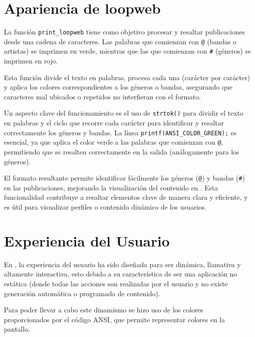 \section{Apariencia de loopweb}
La función \texttt{print\_loopweb} tiene como objetivo procesar y resaltar publicaciones desde una cadena de caracteres. Las palabras que comienzan con \texttt{@} (bandas o artistas) se imprimen en verde, mientras que las que comienzan con \texttt{\#} (géneros) se imprimen en rojo.

Esta función divide el texto en palabras, procesa cada una (carácter por carácter) y aplica los colores correspondientes a los géneros o bandas, asegurando que caracteres mal ubicados o repetidos no interfieran con el formato.

Un aspecto clave del funcionamiento es el uso de \texttt{strtok()} para dividir el texto en palabras y el ciclo que recorre cada carácter para identificar y resaltar correctamente los géneros y bandas. La línea \texttt{printf(ANSI\_COLOR\_GREEN);} es esencial, ya que aplica el color verde a las palabras que comienzan con \texttt{@}, permitiendo que se resalten correctamente en la salida (análogamente para los géneros).

El formato resultante permite identificar fácilmente los géneros (\texttt{@}) y bandas (\texttt{\#}) en las publicaciones, mejorando la visualización del contenido en \loopweb. Esta funcionalidad contribuye a resaltar elementos clave de manera clara y eficiente, y es útil para visualizar perfiles o contenido dinámico de los usuarios.

\section{Experiencia del Usuario}
En \loopweb, la experiencia del usuario ha sido diseñada para ser dinámica, llamativa y altamente interactiva, esto debido a su característica de ser una aplicación no estática (donde todas las acciones son realizadas por el usuario y no existe generación automática o programada de contenido).

Para poder llevar a cabo este dinamismo se hizo uso de los colores proporcionados por el código ANSI, que permite representar colores en la pantalla.